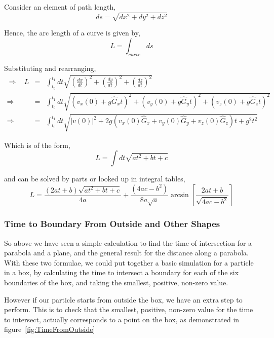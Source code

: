 \documentclass[11pt,a4paper,oneside]{article}
\begin{document}
Consider an element of path length,
\begin{equation}
ds = \sqrt{dx^{2} + dy^{2} + dz^{2}}
\end{equation}

Hence, the arc length of a curve is given by,
\begin{equation}
L = \int_{curve} ds
\end{equation}

Substituting and rearranging, 
\begin{eqnarray}
\Rightarrow \ \ \ \ L &=& \int_{t_{0}}^{t_{1}} dt \sqrt{ \left( \frac{dx}{dt} \right)^{2} + \left( \frac{dy}{dt} \right)^{2} + \left( \frac{dz}{dt} \right)^{2} } \\
\Rightarrow \ \ \ \ \ &=& \int_{t_{0}}^{t_{1}} dt \sqrt{ \left( v_{x}(0) + g\hat{G}_{x}t \right)^{2} + \left( v_{y}(0) + g\hat{G}_{y}t \right)^{2} + \left( v_{z}(0) + g\hat{G}_{z}t \right)^{2} } \\
\Rightarrow \ \ \ \ \ &=& \int_{t_{0}}^{t_{1}} dt \sqrt{ |v(0)|^{2} + 2g\left( v_{x}(0)\hat{G}_{x} + v_{y}(0)\hat{G}_{y} + v_{z}(0)\hat{G}_{z} \right)t + g^{2}t^{2} }
\end{eqnarray}

Which is of the form, 
\begin{equation}
L = \int dt \sqrt{ at^{2} + bt + c}
\end{equation}

and can be solved by parts or looked up in integral tables,
\begin{equation}
L = \frac{(2at + b)\sqrt{at^{2} + bt + c}}{4a} + \frac{(4ac - b^{2})}{8a\sqrt{a}}\arcsin \left[ \frac{2at + b}{\sqrt{4ac - b^{2}}} \right]
\label{eqn:ArcLength}
\end{equation}

\subsubsection*{Time to Boundary From Outside and Other Shapes}

So above we have seen a simple calculation to find the time of intersection for a parabola and a plane, and the general result for the distance along a parabola. With these two formulae, we could put together a basic simulation for a particle in a box, by calculating the time to intersect a boundary for each of the six boundaries of the box, and taking the smallest, positive, non-zero value. 

However if our particle starts from outside the box, we have an extra step to perform. This is to check that the smallest, positive, non-zero value for the time to intersect, actually corresponds to a point on the box, as demonstrated in figure~\ref{fig:TimeFromOutside}
\end{document}
